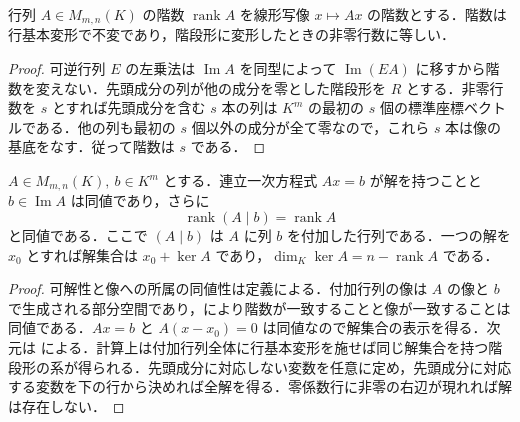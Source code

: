 \begin{prop}[行列の階数と階段形]
行列 $A\in M_{m,n}(K)$ の階数 $\operatorname{rank}A$ を線形写像 $x\mapsto Ax$ の階数とする．階数は行基本変形で不変であり，階段形に変形したときの非零行数に等しい．
\end{prop}
\begin{proof}
可逆行列 $E$ の左乗法は $\operatorname{Im}A$ を同型によって $\operatorname{Im}(EA)$ に移すから階数を変えない．先頭成分の列が他の成分を零とした階段形を $R$ とする．非零行数を $s$ とすれば先頭成分を含む $s$ 本の列は $K^m$ の最初の $s$ 個の標準座標ベクトルである．他の列も最初の $s$ 個以外の成分が全て零なので，これら $s$ 本は像の基底をなす．従って階数は $s$ である．
\end{proof}
\begin{prop}[連立一次方程式の解と階数]
$A\in M_{m,n}(K),\ b\in K^m$ とする．連立一次方程式 $Ax=b$ が解を持つことと $b\in\operatorname{Im}A$ は同値であり，さらに
\[
 \operatorname{rank}(A\mid b)=\operatorname{rank}A
\]
と同値である．ここで $(A\mid b)$ は $A$ に列 $b$ を付加した行列である．一つの解を $x_0$ とすれば解集合は $x_0+\ker A$ であり，$\dim_K\ker A=n-\operatorname{rank}A$ である．
\end{prop}
\begin{proof}
可解性と像への所属の同値性は定義による．付加行列の像は $A$ の像と $b$ で生成される部分空間であり，により階数が一致することと像が一致することは同値である．$Ax=b$ と $A(x-x_0)=0$ は同値なので解集合の表示を得る．次元は による．計算上は付加行列全体に行基本変形を施せば同じ解集合を持つ階段形の系が得られる．先頭成分に対応しない変数を任意に定め，先頭成分に対応する変数を下の行から決めれば全解を得る．零係数行に非零の右辺が現れれば解は存在しない．
\end{proof}
